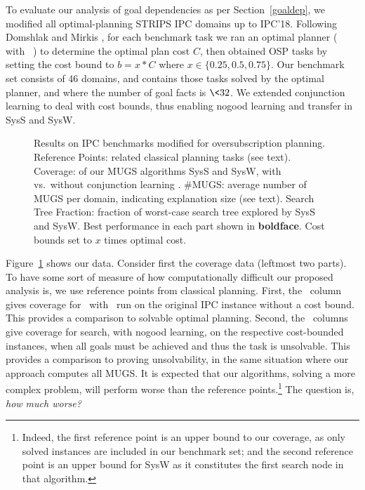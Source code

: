 To evaluate our analysis of goal dependencies as per
Section~\ref{goaldep}, we modified all optimal-planning STRIPS IPC
domains up to IPC'18. Following Domshlak and
Mirkis , for each benchmark task we
ran an optimal planner (\astar
with \hlmcut\ \cite{helmert:domshlak:icaps-09}) to determine the
optimal plan cost $C$, then obtained OSP tasks by setting the cost
bound to $b = x * C$ where $x \in \{0.25, 0.5, 0.75\}$. Our benchmark
set consists of 46 domains, and contains those tasks solved by the
optimal planner, and where the number of goal facts is $\< 32$.
%
%
We extended conjunction learning \cite{steinmetz:hoffmann:ai-17} to
deal with cost bounds, thus enabling nogood learning and transfer in
SysS and SysW.


\setlength{\tabcolsep}{2pt}
\renewcommand{\arraystretch}{0.8}
\begin{figure}[h!]
	\tiny
	\centering  
        \vspace{-0.2cm}
	\caption{Results on IPC benchmarks modified for oversubscription planning. Reference Points: related classical planning tasks (see text). Coverage: of our MUGS algorithms SysS and SysW, with vs.\ without conjunction learning \hc. \#MUGS: average number of MUGS per domain, indicating explanation size (see text). Search Tree Fraction: fraction of worst-case search tree explored by SysS and SysW. Best performance in each part shown in \textbf{boldface}. Cost bounds set to $x$ times optimal cost.}
	\label{table:coverage_ipc}
        \vspace{-0.5cm}
\end{figure}

Figure~\ref{table:coverage_ipc} shows our data. Consider first the
coverage data (leftmost two parts). To have some sort of measure of
how computationally difficult our proposed analysis is, we use
reference points from classical planning. First, the \hlmcut\ column
gives coverage for \astar\ with \hlmcut\ run on the original IPC
instance without a cost bound. This provides a comparison to solvable
optimal planning. Second, the \hc\ columns give coverage for search,
with nogood learning, on the respective cost-bounded instances, when
all goals must be achieved and thus the task is unsolvable. This
provides a comparison to proving unsolvability, in the same situation
where our approach computes all MUGS.
%
It is expected that our algorithms, solving a more complex problem,
will perform worse than the reference points.\footnote{Indeed, the
first reference point is an upper bound to our coverage, as only
solved instances are included in our benchmark set; and the second
reference point is an upper bound for SysW as it constitutes the first
search node in that algorithm.} The question is, \emph{how much
worse?}

